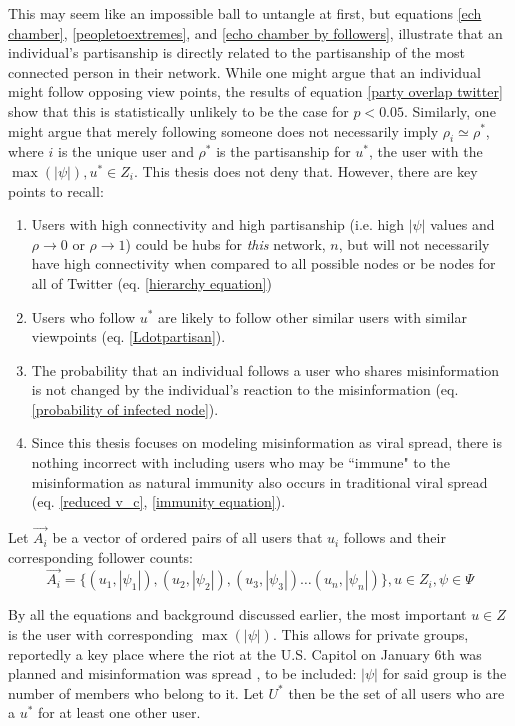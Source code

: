 \documentclass[preprint,review,12pt]{elsarticle}
\begin{document}
This may seem like an impossible ball to untangle at first, but equations \ref{ech chamber}, \ref{peopletoextremes}, and \ref{echo chamber by followers}, illustrate that an individual's partisanship is directly related to the partisanship of the most connected person in their network. While one might argue that an individual might follow opposing view points, the results of equation \ref{party overlap twitter} show that this is statistically unlikely to be the case for $p < 0.05$. Similarly, one might argue that merely following someone does not necessarily imply $\rho_i \simeq \rho^*$, where $i$ is the unique user and $\rho^*$ is the partisanship for $u^*$, the user with the $\max(|\psi|), u^* \in Z_i$. This thesis does not deny that. However, there are key points to recall:
\begin{enumerate}
    \item Users with high connectivity and high partisanship (i.e. high $|\psi|$ values and $\rho \rightarrow 0$ or $\rho \rightarrow 1$) could be hubs for \textit{this} network, $n$, but will not necessarily have high connectivity when compared to all possible nodes or be nodes for all of Twitter (eq. \ref{hierarchy equation}) 
    \item Users who follow $u^*$ are likely to follow other similar users with similar viewpoints (eq. \ref{Ldotpartisan}).
    \item The probability that an individual follows a user who shares misinformation is not changed by the individual's reaction to the misinformation (eq. \ref{probability of infected node}).
    \item Since this thesis focuses on modeling misinformation as viral spread, there is nothing incorrect with including users who may be ``immune" to the misinformation as natural immunity also occurs in traditional viral spread (eq. \ref{reduced v_c}, \ref{immunity equation}).
\end{enumerate}

Let $\vec{A_i}$ be a vector of ordered pairs of all users that $u_i$ follows and their corresponding follower counts:
\begin{equation} 
\label{row of adjacency matrix}
\vec{A_i}=\{(u_1,|\psi_1|),(u_2,|\psi_2|),(u_3,|\psi_3|)\dots (u_n,|\psi_n|)\}, u \in Z_i, \psi \in \Psi
\end{equation}

By all the equations and background discussed earlier, the most important $u \in Z$ is the user with corresponding $\max(|\psi|)$. This allows for private groups, reportedly a key place where the riot at the U.S. Capitol on January 6th was planned and misinformation was spread \cite{yin2021facebook,horwitz2020facebook}, to be included: $|\psi|$ for said group is the number of members who belong to it. 
Let $U^*$ then be the set of all users who are a $u^*$ for at least one other user.
\end{document}
